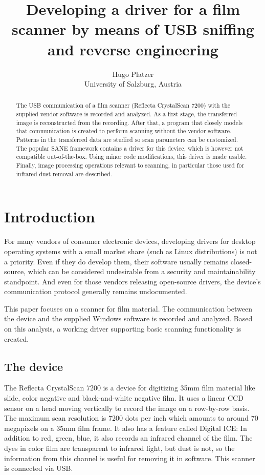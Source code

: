 \documentclass{article}
\begin{document}
\title{Developing a driver for a film scanner by means of USB sniffing and reverse engineering}
\author{Hugo Platzer \\ University of Salzburg, Austria}
\maketitle

\begin{abstract}
The USB communication of a film scanner (Reflecta CrystalScan 7200) with the supplied vendor software is recorded and analyzed. As a first stage, the transferred image is reconstructed from the recording.  After that, a program that closely models that communication is created to perform scanning without the vendor software. Patterns in the transferred data are studied so scan parameters can be customized.
The popular SANE framework contains a driver for this device, which is however not compatible out-of-the-box.
Using minor code modifications, this driver is made usable. Finally, image processing operations relevant to scanning, in particular those used for infrared dust removal are described.
\end{abstract}

\section{Introduction}

For many vendors of consumer electronic devices,
developing drivers for desktop operating systems
with a small market share (such as Linux distributions) is not a priority. Even if
they do develop them, their software usually remains closed-source, which can be considered undesirable from a security and maintainability standpoint. And even for those
vendors releasing open-source drivers, the device's communication protocol generally remains
undocumented.

This paper focuses on a scanner for film material. The communication between the
device and the supplied Windows software is recorded and analyzed. Based on this analysis,
a working driver supporting basic scanning functionality is created.

\subsection{The device}

The Reflecta CrystalScan 7200 is a device for digitizing 35mm film material like
slide, color negative and black-and-white negative film.
It uses a linear CCD sensor on a head moving vertically to record the image on a row-by-row basis.
The maximum scan resolution is 7200 dots per inch which amounts to around 70 megapixels
on a 35mm film frame. It also has a feature called Digital ICE: In addition to red, green, blue, it also
records an infrared channel of the film. The dyes in color film are transparent to infrared light,
but dust is not, so the information from this channel is useful for removing it in software.
This scanner is connected via USB. \cite{rcs} \cite{rcs_review}
\end{document}
